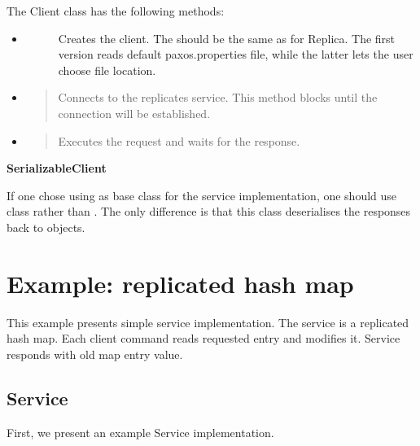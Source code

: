 The Client class has the following methods:
\begin{itemize}
\item {} \begin{description}
\item[{}]
\item[] \hfill

Creates the client. The  should be the same as for Replica. The first version reads default paxos.properties file, while the latter lets the user choose file location.

\end{description}

\item {} 
\begin{quote}

Connects to the replicates service. This method blocks until the connection will be established.
\end{quote}

\item {} 
\begin{quote}

Executes the request and waits for the response.
\end{quote}

\end{itemize}

\textbf{SerializableClient}

If one chose using  as base class for the service implementation, one should use class  rather than . The only difference is that this class deserialises the responses back to objects.


\section{Example: replicated hash map}
\label{example::doc}\label{example:example-replicated-hash-map}
This example presents simple service implementation. The service is a replicated hash map. Each client command reads requested entry and modifies it. Service responds with old map entry value.


\subsection{Service}
\label{example:service}
First, we present an example Service implementation.

